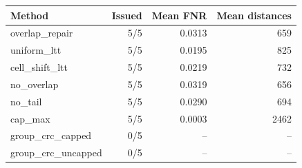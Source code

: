 \begin{tabular}{lrrr}
\hline
Method & Issued & Mean FNR & Mean distances \\
\hline
overlap\_repair & 5/5 & 0.0313 & 659 \\
uniform\_ltt & 5/5 & 0.0195 & 825 \\
cell\_shift\_ltt & 5/5 & 0.0219 & 732 \\
no\_overlap & 5/5 & 0.0319 & 656 \\
no\_tail & 5/5 & 0.0290 & 694 \\
cap\_max & 5/5 & 0.0003 & 2462 \\
group\_crc\_capped & 0/5 & -- & -- \\
group\_crc\_uncapped & 0/5 & -- & -- \\
\hline
\end{tabular}
